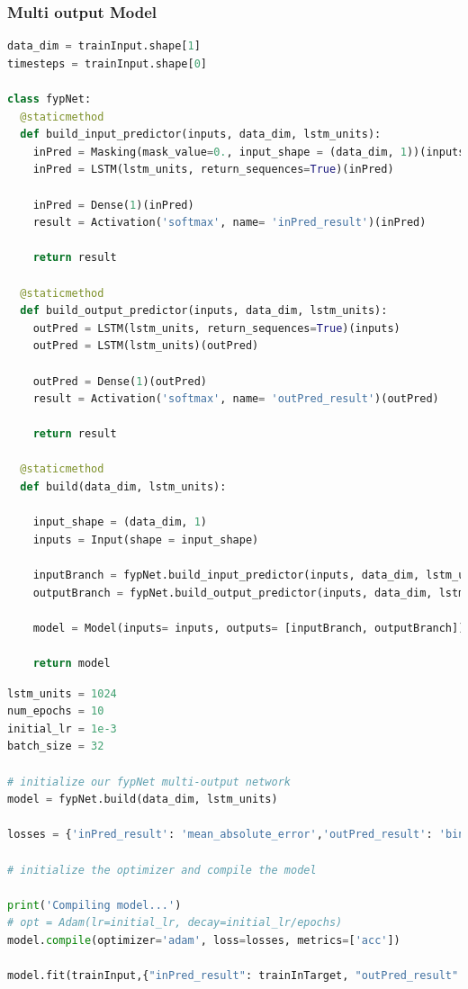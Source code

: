 \documentclass[10pt,onecolumn,letterpaper]{article}
\begin{document}
\subsubsection{Multi output Model}

\begin{lstlisting}[language=Python, breaklines=true]
data_dim = trainInput.shape[1]
timesteps = trainInput.shape[0]

class fypNet: 
  @staticmethod
  def build_input_predictor(inputs, data_dim, lstm_units):
    inPred = Masking(mask_value=0., input_shape = (data_dim, 1))(inputs)
    inPred = LSTM(lstm_units, return_sequences=True)(inPred)
    
    inPred = Dense(1)(inPred)
    result = Activation('softmax', name= 'inPred_result')(inPred)
    
    return result
    
  @staticmethod
  def build_output_predictor(inputs, data_dim, lstm_units): 
    outPred = LSTM(lstm_units, return_sequences=True)(inputs)
    outPred = LSTM(lstm_units)(outPred)
    
    outPred = Dense(1)(outPred)
    result = Activation('softmax', name= 'outPred_result')(outPred)

    return result
  
  @staticmethod
  def build(data_dim, lstm_units):
         
    input_shape = (data_dim, 1)
    inputs = Input(shape = input_shape)
   
    inputBranch = fypNet.build_input_predictor(inputs, data_dim, lstm_units)
    outputBranch = fypNet.build_output_predictor(inputs, data_dim, lstm_units)
    
    model = Model(inputs= inputs, outputs= [inputBranch, outputBranch])
    
    return model
\end{lstlisting} 
 
\begin{lstlisting}[language=Python, breaklines=true]
lstm_units = 1024
num_epochs = 10
initial_lr = 1e-3
batch_size = 32

# initialize our fypNet multi-output network
model = fypNet.build(data_dim, lstm_units)
 
losses = {'inPred_result': 'mean_absolute_error','outPred_result': 'binary_crossentropy'}
 
# initialize the optimizer and compile the model

print('Compiling model...')
# opt = Adam(lr=initial_lr, decay=initial_lr/epochs)
model.compile(optimizer='adam', loss=losses, metrics=['acc'])    

model.fit(trainInput,{"inPred_result": trainInTarget, "outPred_result": trainTarget}, validation_data=(valInput, {"inPred_result": trainValTarget, "outPred_result": valTarget}), batch_size = batch_size, Stateful=False, epochs=num_epochs, verbose=1)

\end{lstlisting} 
\end{document}
